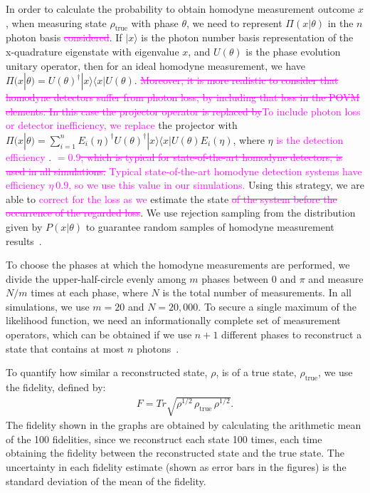 \documentclass[
reprint,
superscriptaddress,
showpacs,
amsmath,
amssymb,
aps,
pra,
longbibliography
]{revtex4-1}
\providecommand{\aucmnt}[1]{#1}
\providecommand{\editcolor}[2]{\textcolor{#1}{#2}}
\providecommand{\aucmnt}[1]{}
\providecommand{\editcolor}[2]{#2}
\newcommand{\SG}[1]{\editcolor{magenta}{#1}}
\newcommand{\SGs}[1]{\aucmnt{\editcolor{magenta}{\sout{#1}}}}
\begin{document}
In order to calculate the probability to obtain homodyne measurement
outcome $x$, when measuring state $\rho_{\mathrm{true}}$ with phase
$\theta$, we need to represent $\Pi (x|\theta)$ in the $n$ photon
basis \SGs{considered}. If $|x\rangle$ is the photon number basis
representation of the x-quadrature eigenstate with eigenvalue $x$, and
$U(\theta)$ is the phase evolution unitary operator, then for an ideal
homodyne measurement, we have
$\Pi (x|\theta) = U(\theta)^{\dagger}|x\rangle \langle x|
U(\theta)$. \SGs{Moreover, it is more realistic to consider that
  homodyne detectors suffer from photon loss, by including that loss
  in the POVM elements. In this case the projector operator is
  replaced by}\SG{To include photon loss or detector inefficiency, we
  replace} the projector with
$\Pi (x|\theta) = \sum_{i=1}^{n} E_i(\eta)^{\dagger}
U(\theta)^{\dagger}|x\rangle \langle x| U(\theta) E_i(\eta)$, where
$\eta$ \SG{is the detection efficiency \cite{Lvovsky2004}}.
\SGs{$ = 0.9$, which is typical for state-of-the-art homodyne
  detectors, is used in all simulations.} \SG{Typical state-of-the-art
  homodyne detection systems have efficiency $\eta ~ 0.9$, so we use
  this value in our simulations.} Using this strategy, we are able to
\SG{correct for the loss as we} estimate the state\SGs{ of the system
  before the occurrence of the regarded loss}. We use rejection
sampling from the distribution given by $P(x|\theta)$ to guarantee
random samples of homodyne measurement results~\cite{Kennedy1980}.

To choose the phases at which the homodyne measurements are performed, we divide the upper-half-circle evenly among $m$ phases between 0 and $\pi$ and measure $N/m$ times at each phase, where $N$ is the total number of measurements. In all simulations, we use $m=20$ and $N = 20,000$. To secure a single maximum of the likelihood function, we need an informationally complete set of measurement operators, which can be obtained if we use $n+1$ different phases to reconstruct a state that contains at most $n$ photons~\cite{Leonhardt1997}. 

To quantify how similar a reconstructed state, $\rho$, is of a true state, $\rho_{\mathrm{true}}$, we use the fidelity, defined by:
\begin{eqnarray}
F = Tr \sqrt{\rho^{1/2}\, \rho_{\mathrm{true}} \, \rho^{1/2}}.
\end{eqnarray}  
The fidelity shown in the graphs are obtained by calculating the arithmetic mean of the 100 fidelities, since we reconstruct each state 100 times, each time obtaining the fidelity between the reconstructed state and the true state. The uncertainty in each fidelity estimate (shown as error bars in the figures) is the standard deviation of the mean of the fidelity.
\end{document}
